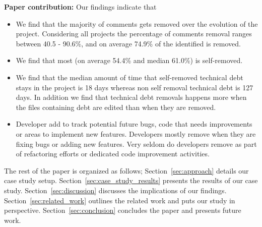 \textbf{Paper contribution:} Our findings indicate that 
\begin{itemize}
	\item We find that the majority of \SATD comments gets removed over the evolution of the project. Considering all projects the percentage of \SATD comments removal ranges between 40.5 - 90.6\%, and on average 74.9\% of the identified \SATD is removed.
	\item We find that most \SATD (on average 54.4\% and median 61.0\%) is self-removed.
	\item We find that the median amount of time that self-removed technical debt stays in the project is 18 days whereas non self removal technical debt is 127 days. In addition we find that technical debt removals happens more when the files containing debt are edited than when they are removed.
	\item Developer add \SATD to track potential future bugs, code that needs improvements or areas to implement new features. Developers mostly remove \SATD when they are fixing bugs or adding new features. Very seldom do developers remove \SATD as part of refactoring efforts or dedicated code improvement activities.
\end{itemize}

The rest of the paper is organized as follows; Section~\ref{sec:approach} details our case study setup. Section~\ref{sec:case_study_results} presents the results of our case study. Section~\ref{sec:discussion} discusses the implications of our findings. Section~\ref{sec:related_work} outlines the related work and puts our study in perspective. Section~\ref{sec:conclusion} concludes the paper and presents future work.





